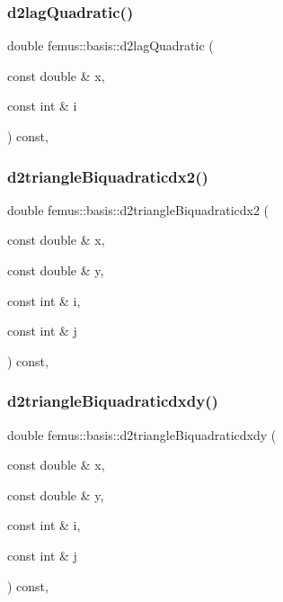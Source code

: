 \subsubsection{\texorpdfstring{d2lag\+Quadratic()}{d2lagQuadratic()}}
{\footnotesize\ttfamily double femus\+::basis\+::d2lag\+Quadratic (\begin{DoxyParamCaption}\item[{const double \&}]{x,  }\item[{const int \&}]{i }\end{DoxyParamCaption}) const\hspace{0.3cm}{\ttfamily [inline]}, {\ttfamily [protected]}}

\mbox{\label{classfemus_1_1basis_a065d6f7c99411b8410bde98fcb12a089}} 
\subsubsection{\texorpdfstring{d2triangle\+Biquadraticdx2()}{d2triangleBiquadraticdx2()}}
{\footnotesize\ttfamily double femus\+::basis\+::d2triangle\+Biquadraticdx2 (\begin{DoxyParamCaption}\item[{const double \&}]{x,  }\item[{const double \&}]{y,  }\item[{const int \&}]{i,  }\item[{const int \&}]{j }\end{DoxyParamCaption}) const\hspace{0.3cm}{\ttfamily [inline]}, {\ttfamily [protected]}}

\mbox{\label{classfemus_1_1basis_aeebd0fb9806e39c3537021aba7f63f1e}} 
\subsubsection{\texorpdfstring{d2triangle\+Biquadraticdxdy()}{d2triangleBiquadraticdxdy()}}
{\footnotesize\ttfamily double femus\+::basis\+::d2triangle\+Biquadraticdxdy (\begin{DoxyParamCaption}\item[{const double \&}]{x,  }\item[{const double \&}]{y,  }\item[{const int \&}]{i,  }\item[{const int \&}]{j }\end{DoxyParamCaption}) const\hspace{0.3cm}{\ttfamily [inline]}, {\ttfamily [protected]}}

